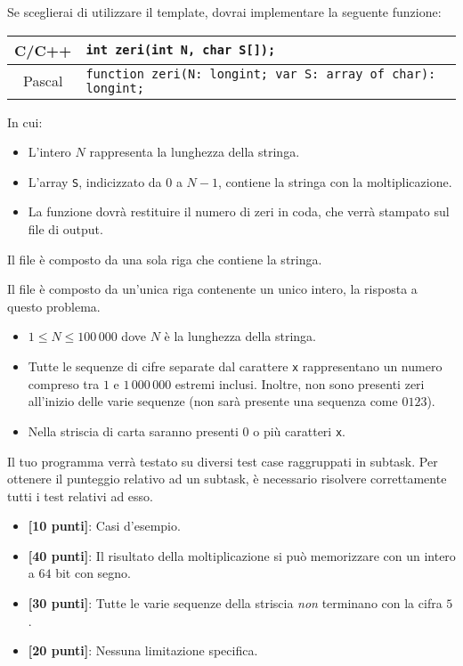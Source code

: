 Se sceglierai di utilizzare il template, dovrai implementare la seguente funzione:
\begin{center}\begin{tabularx}{\textwidth}{|c|X|}
\hline
C/C++  & \verb|int zeri(int N, char S[]);|\\
\hline
Pascal & \verb|function zeri(N: longint; var S: array of char): longint;|\\
\hline
\end{tabularx}\end{center}
In cui:
\begin{itemize}[nolistsep]
  \item L'intero $N$ rappresenta la lunghezza della stringa.
  \item L'array \texttt{S}, indicizzato da $0$ a $N-1$, contiene la stringa con la moltiplicazione.
  \item La funzione dovrà restituire il numero di zeri in coda, che verrà stampato sul file di output.
\end{itemize}

\InputFile
Il file  è composto da una sola riga che contiene la stringa.

\OutputFile
Il file \outputfile{} è composto da un'unica riga contenente un unico intero, la risposta a questo problema.

\pagebreak
\Constraints
\begin{itemize}[nolistsep, itemsep=2mm]
	\item $1 \le N \le 100\,000$ dove $N$ è la lunghezza della stringa.
    \item Tutte le sequenze di cifre separate dal carattere \texttt{x} rappresentano un numero compreso tra $1$ e $1\,000\,000$ estremi inclusi. Inoltre, non sono presenti zeri all'inizio delle varie sequenze (non sarà presente una sequenza come $0123$).
    \item Nella striscia di carta saranno presenti $0$ o più caratteri \texttt{x}.
\end{itemize}

\Scoring
Il tuo programma verrà testato su diversi test case raggruppati in subtask.
Per ottenere il punteggio relativo ad un subtask, è necessario risolvere
correttamente tutti i test relativi ad esso.

\begin{itemize}[nolistsep,itemsep=2mm]
  \item \textbf{ [10 punti]}: Casi d'esempio.
  \item \textbf{ [40 punti]}: Il risultato della moltiplicazione si può memorizzare con un intero a $64$ bit con segno.
  \item \textbf{ [30 punti]}: Tutte le varie sequenze della striscia \emph{non} terminano con la cifra $5$.
  \item \textbf{ [20 punti]}: Nessuna limitazione specifica.
\end{itemize}



\Examples
\begin{example}
%
%
\end{example}
